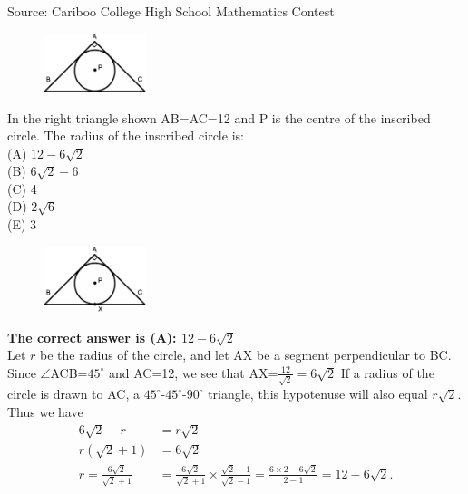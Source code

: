 \documentclass{article}
\begin{document}
\scriptsize
Source: Cariboo College High School Mathematics Contest

\normalsize
\begin{figure}
	\includegraphics[width=30mm,viewport=19 116 527 413]{CCJPR74-16pic.eps}
\end{figure}
In the right triangle shown AB=AC=12 and P is the centre of the inscribed circle. The radius of the inscribed circle is:\\
(A) $12-6\sqrt{2}$\\
(B) $6\sqrt{2}-6$\\
(C) 4\\
(D) $2\sqrt{6}$\\
(E) 3\\

\begin{figure}
	\includegraphics[width=30mm,viewport=16 83 534 412]{CCJPR74-16pic2.eps}
\end{figure}

\textbf{The correct answer is (A): $12-6\sqrt{2}$}\\[1 ex]
Let $r$ be the radius of the circle, and let AX be a segment perpendicular to BC. Since $\angle$ACB=$45^{\circ}$ and AC=12, we see that AX=$\frac{12}{\sqrt{2}}=6\sqrt{2}$ If a radius of the circle is drawn to AC, a $45^{\circ}$-$45^{\circ}$-$90^{\circ}$ triangle, this hypotenuse will also equal $r\sqrt{2}$. Thus we have
\begin{align*}
6\sqrt{2}-r&=r\sqrt{2}\\
r(\sqrt{2}+1)&=6\sqrt{2}\\
r=\frac{6\sqrt{2}}{\sqrt{2}+1}&=\frac{6\sqrt{2}}{\sqrt{2}+1}\times\frac{\sqrt{2}-1}{\sqrt{2}-1}=\frac{6\times2-6\sqrt{2}}{2-1}=12-6\sqrt{2}.
\end{align*}
\\[5 ex]
\end{document}
